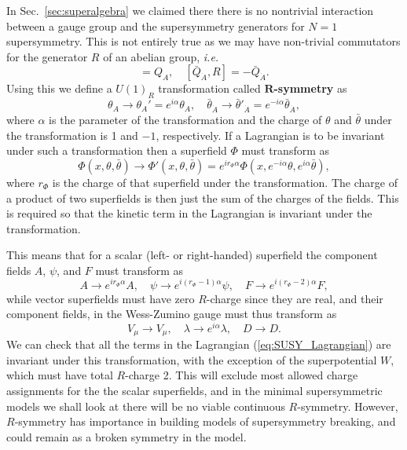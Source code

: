 \documentclass[notes.tex]{subfiles}
\begin{document}
In Sec.~\ref{sec:superalgebra} we claimed there there is no nontrivial interaction between a gauge group and the supersymmetry generators for $N=1$ supersymmetry. This is not entirely true as we may have non-trivial commutators for the generator $R$ of an abelian group, {\it i.e.}
\begin{equation}
[Q_A, R] = Q_A, \quad  [\bar Q_{\dot A}, R ] = -\bar Q_{\dot A}.
\end{equation}
Using this we define a $U(1)_R$ transformation called {\bf $\mathbf R$-symmetry} as
\begin{equation}
\theta_A \to \theta_A' = e^{i\alpha} \theta_A, \quad \bar\theta_{\dot A} \to  \bar\theta'_{\dot A}= e^{-i\alpha} \bar\theta_{\dot A},
\end{equation}
where $\alpha$ is the parameter of the transformation and the charge of $\theta$ and $\bar\theta$ under the transformation is 1 and $-1$, respectively.
If a Lagrangian is to be invariant under such a transformation then a superfield $\Phi$ must transform as
\begin{equation}
\Phi(x,\theta,\bar\theta)\to \Phi'(x,\theta,\bar\theta)= e^{ir_\Phi\alpha}\Phi(x,e^{-i\alpha} \theta,e^{i\alpha} \bar\theta),
\end{equation}
where $r_\Phi$ is the charge of that superfield under the transformation. The charge of a product of two superfields is then just the sum of the charges of the fields. This is required so that the kinetic term in the Lagrangian is invariant under the transformation.

This means that for a scalar (left- or right-handed) superfield the component fields $A$, $\psi$, and $F$ must transform as
\begin{equation}
A\to e^{ir_\Phi\alpha}A,\quad \psi\to e^{i(r_\Phi-1)\alpha} \psi,\quad F\to e^{i(r_\Phi-2)\alpha} F,
\end{equation}
while vector superfields must have zero $R$-charge since they are real, and their component fields, in the Wess-Zumino gauge must thus transform as
\begin{equation}
V_\mu \to V_\mu ,\quad \lambda \to e^{i\alpha} \lambda,\quad D\to D.
\end{equation}
We can check that all the terms in the Lagrangian (\ref{eq:SUSY_Lagrangian}) are invariant under this transformation, with the exception of the superpotential $W$, which must have total $R$-charge 2. This will exclude most allowed charge assignments for the the scalar superfields, and in the minimal supersymmetric models we shall look at there will be no viable continuous $R$-symmetry. However, $R$-symmetry has importance in building models of supersymmetry breaking, and could remain as a broken symmetry in the model.
\end{document}
